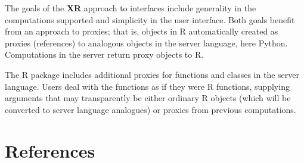 \documentclass{article}
\begin{document}
The goals of the \textbf{XR} approach to interfaces include generality
in the computations supported and simplicity in the user
interface. Both goals benefit from an approach to proxies; that is,
objects in R automatically created as proxies (references) to
analogous objects in the server language, here Python. Computations in
the server return proxy objects to R.

The R package includes additional proxies for functions and classes in
the server language. Users deal with the functions as if they were R
functions, supplying arguments that may transparently be either
ordinary R objects (which will be converted to server language
analogues) or proxies from previous computations.

\section*{References}


\end{document}
